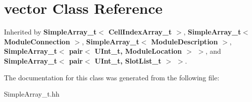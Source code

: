 \section{vector Class Reference}
\label{classstd_1_1vector}


Inherited by {\bf SimpleArray\_\-t$<$ CellIndexArray\_\-t $>$}, {\bf SimpleArray\_\-t$<$ ModuleConnection $>$}, {\bf SimpleArray\_\-t$<$ ModuleDescription $>$}, {\bf SimpleArray\_\-t$<$ pair$<$ UInt\_\-t, ModuleLocation $>$ $>$}, and {\bf SimpleArray\_\-t$<$ pair$<$ UInt\_\-t, SlotList\_\-t $>$ $>$}.

The documentation for this class was generated from the following file:\begin{DoxyCompactItemize}
\item 
SimpleArray\_\-t.hh\end{DoxyCompactItemize}
